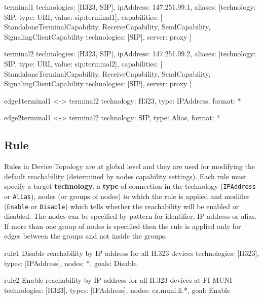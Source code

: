 \begin{EntityExample}{}{terminal1}{}
technologies: [H323, SIP],
ipAddress: 147.251.99.1,
aliases: [{technology: SIP, type: URI, value: sip:terminal1}],
capabilities: [
  StandaloneTerminalCapability,
  ReceiveCapability, SendCapability,
  SignalingClientCapability {technologies: [SIP], server: proxy}
]
\end{EntityExample}

\begin{EntityExample}{}{terminal2}{}
technologies: [H323, SIP],
ipAddress: 147.251.99.2,
aliases: [{technology: SIP, type: URI, value: sip:terminal2}],
capabilities: [
  StandaloneTerminalCapability,
  ReceiveCapability, SendCapability,
  SignalingClientCapability {technologies: [SIP], server: proxy}
]
\end{EntityExample}

\begin{EntityExample}{}{edge1}{terminal1 <-> terminal2}
technology: H323,
type: IPAddress,
format: *
\end{EntityExample}

\begin{EntityExample}{}{edge2}{terminal1 <-> terminal2}
technology: SIP,
type: Alias,
format: *
\end{EntityExample} 
  
  
\subsection{Rule}
Rules in Device Topology are at global level and they are used for modifying 
the default reachability (determined by nodes capability settings). Each rule 
must specify a target \textbf{technology}, a \textbf{type} of connection in 
the technology (\verb|IPAddress| or \verb|Alias|), 
nodes (or groups of nodes) 
to which the rule is applied and modifier (\verb|Enable| or \verb|Disable|) 
which tells whether the reachability will be enabled or disabled. The nodes 
can be specified by pattern for identifier, IP address or alias. If more than 
one group of nodes is specified then the rule is applied only for edges 
between the groups and not inside the groups.

\begin{EntityExample}{}{rule1}%
      {Disable reachability by IP address for all H.323 devices}
technologies: [H323],
types: [IPAddress],
nodes: *,
goals: Disable
\end{EntityExample}

\begin{EntityExample}{}{rule2}%
      {Enable reachability by IP address for all H.323 devices at FI MUNI}
technologies: [H323],
types: [IPAddress],
nodes: cz.muni.fi.*,
goal: Enable
\end{EntityExample}

